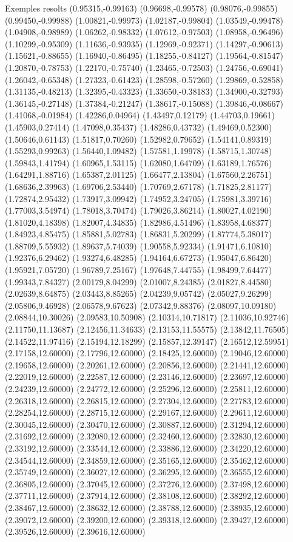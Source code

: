 \documentclass[11pt,a4paper]{article}
\begin{document}
\begin{fmex}{Exemples resolts}
(0.95315,-0.99163) (0.96698,-0.99578) (0.98076,-0.99855) (0.99450,-0.99988) (1.00821,-0.99973) (1.02187,-0.99804) (1.03549,-0.99478) (1.04908,-0.98989) (1.06262,-0.98332) (1.07612,-0.97503) (1.08958,-0.96496) (1.10299,-0.95309) (1.11636,-0.93935) (1.12969,-0.92371) (1.14297,-0.90613) (1.15621,-0.88655) (1.16940,-0.86495) (1.18255,-0.84127) (1.19564,-0.81547) (1.20870,-0.78753) (1.22170,-0.75740) (1.23465,-0.72503) (1.24756,-0.69041) (1.26042,-0.65348) (1.27323,-0.61423) (1.28598,-0.57260) (1.29869,-0.52858) (1.31135,-0.48213) (1.32395,-0.43323) (1.33650,-0.38183) (1.34900,-0.32793) (1.36145,-0.27148) (1.37384,-0.21247) (1.38617,-0.15088) (1.39846,-0.08667) (1.41068,-0.01984) (1.42286,0.04964) (1.43497,0.12179) (1.44703,0.19661) (1.45903,0.27414) (1.47098,0.35437) (1.48286,0.43732) (1.49469,0.52300) (1.50646,0.61143) (1.51817,0.70260) (1.52982,0.79652) (1.54141,0.89319) (1.55293,0.99263) (1.56440,1.09482) (1.57581,1.19978) (1.58715,1.30748) (1.59843,1.41794) (1.60965,1.53115) (1.62080,1.64709) (1.63189,1.76576) (1.64291,1.88716) (1.65387,2.01125) (1.66477,2.13804) (1.67560,2.26751) (1.68636,2.39963) (1.69706,2.53440) (1.70769,2.67178) (1.71825,2.81177) (1.72874,2.95432) (1.73917,3.09942) (1.74952,3.24705) (1.75981,3.39716) (1.77003,3.54974) (1.78018,3.70474) (1.79026,3.86214) (1.80027,4.02190) (1.81020,4.18398) (1.82007,4.34835) (1.82986,4.51496) (1.83958,4.68377) (1.84923,4.85475) (1.85881,5.02783) (1.86831,5.20299) (1.87774,5.38017) (1.88709,5.55932) (1.89637,5.74039) (1.90558,5.92334) (1.91471,6.10810) (1.92376,6.29462) (1.93274,6.48285) (1.94164,6.67273) (1.95047,6.86420) (1.95921,7.05720) (1.96789,7.25167) (1.97648,7.44755) (1.98499,7.64477) (1.99343,7.84327) (2.00179,8.04299) (2.01007,8.24385) (2.01827,8.44580) (2.02639,8.64875) (2.03443,8.85265) (2.04239,9.05742) (2.05027,9.26299) (2.05806,9.46928) (2.06578,9.67623) (2.07342,9.88376) (2.08097,10.09180) (2.08844,10.30026) (2.09583,10.50908) (2.10314,10.71817) (2.11036,10.92746) (2.11750,11.13687) (2.12456,11.34633) (2.13153,11.55575) (2.13842,11.76505) (2.14522,11.97416) (2.15194,12.18299) (2.15857,12.39147) (2.16512,12.59951) (2.17158,12.60000) (2.17796,12.60000) (2.18425,12.60000) (2.19046,12.60000) (2.19658,12.60000) (2.20261,12.60000) (2.20856,12.60000) (2.21441,12.60000) (2.22019,12.60000) (2.22587,12.60000) (2.23146,12.60000) (2.23697,12.60000) (2.24239,12.60000) (2.24772,12.60000) (2.25296,12.60000) (2.25811,12.60000) (2.26318,12.60000) (2.26815,12.60000) (2.27304,12.60000) (2.27783,12.60000) (2.28254,12.60000) (2.28715,12.60000) (2.29167,12.60000) (2.29611,12.60000) (2.30045,12.60000) (2.30470,12.60000) (2.30887,12.60000) (2.31294,12.60000) (2.31692,12.60000) (2.32080,12.60000) (2.32460,12.60000) (2.32830,12.60000) (2.33192,12.60000) (2.33544,12.60000) (2.33886,12.60000) (2.34220,12.60000) (2.34544,12.60000) (2.34859,12.60000) (2.35165,12.60000) (2.35462,12.60000) (2.35749,12.60000) (2.36027,12.60000) (2.36295,12.60000) (2.36555,12.60000) (2.36805,12.60000) (2.37045,12.60000) (2.37276,12.60000) (2.37498,12.60000) (2.37711,12.60000) (2.37914,12.60000) (2.38108,12.60000) (2.38292,12.60000) (2.38467,12.60000) (2.38632,12.60000) (2.38788,12.60000) (2.38935,12.60000) (2.39072,12.60000) (2.39200,12.60000) (2.39318,12.60000) (2.39427,12.60000) (2.39526,12.60000) (2.39616,12.60000) 
\end{fmex}
\end{document}
